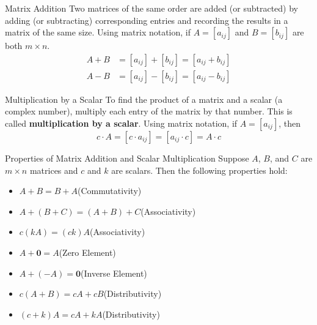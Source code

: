 \documentclass{beamer}
\begin{document}
\begin{frame}
\begin{block}{Matrix Addition}
Two matrices of the same order are added (or subtracted) by adding (or subtracting) corresponding entries and recording the results in a matrix of the same size. Using matrix notation, if $A=[a_{ij}]$ and $B=[b_{ij}]$ are both $m\times n$.
\begin{equation*}
\begin{split}
A+B&=[a_{ij}]+[b_{ij}]=[a_{ij}+b_{ij}]\\
A-B&=[a_{ij}]-[b_{ij}]=[a_{ij}-b_{ij}]
\end{split}
\end{equation*}
\end{block}\pause
\begin{block}{Multiplication by a Scalar}
To find the product of a matrix and a scalar (a complex number), multiply each entry of the matrix by that number. This is called \textbf{multiplication by a scalar}. Using matrix notation, if $A=[a_{ij}]$, then
\[c\cdot A=[c\cdot a_{ij}] = [a_{ij}\cdot c] = A\cdot c\]
\end{block}
\end{frame}

\begin{frame}
\begin{block}{Properties of Matrix Addition and Scalar Multiplication}
Suppose $A$, $B$, and $C$ are $m\times n$ matrices and $c$ and $k$ are scalars. Then the following properties hold:
\begin{itemize}[<+- | alert@+>]
\item$A+B=B+A$\hfill(Commutativity)
\item$A+(B+C)=(A+B)+C$\hfill(Associativity)
\item$c(kA)=(ck)A$\hfill(Associativity)
\item$A+\textbf{0}=A$\hfill(Zero Element)
\item$A+(-A)=\textbf{0}$\hfill(Inverse Element)
\item$c(A+B)=cA+cB$\hfill(Distributivity)
\item$(c+k)A=cA+kA$\hfill(Distributivity)
\end{itemize}
\end{block}
\end{frame}
\end{document}

